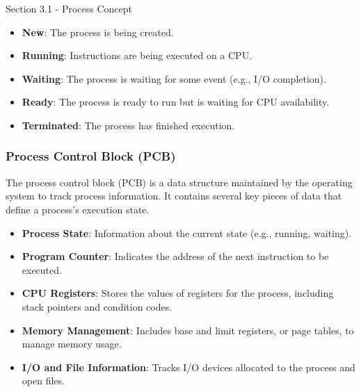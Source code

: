 \begin{notes}{Section 3.1 - Process Concept}
    \begin{highlight}
    
        \begin{itemize}
            \item \textbf{New}: The process is being created.
            \item \textbf{Running}: Instructions are being executed on a CPU.
            \item \textbf{Waiting}: The process is waiting for some event (e.g., I/O completion).
            \item \textbf{Ready}: The process is ready to run but is waiting for CPU availability.
            \item \textbf{Terminated}: The process has finished execution.
        \end{itemize}
    
    \end{highlight}
    
    \subsubsection*{Process Control Block (PCB)}
    
    The process control block (PCB) is a data structure maintained by the operating system to track process information. It contains several key pieces of data that define a process's execution state.
    
    \begin{highlight}
    
        \begin{itemize}
            \item \textbf{Process State}: Information about the current state (e.g., running, waiting).
            \item \textbf{Program Counter}: Indicates the address of the next instruction to be executed.
            \item \textbf{CPU Registers}: Stores the values of registers for the process, including stack pointers and condition codes.
            \item \textbf{Memory Management}: Includes base and limit registers, or page tables, to manage memory usage.
            \item \textbf{I/O and File Information}: Tracks I/O devices allocated to the process and open files.
        \end{itemize}
    
    \end{highlight}
    

\end{notes}

